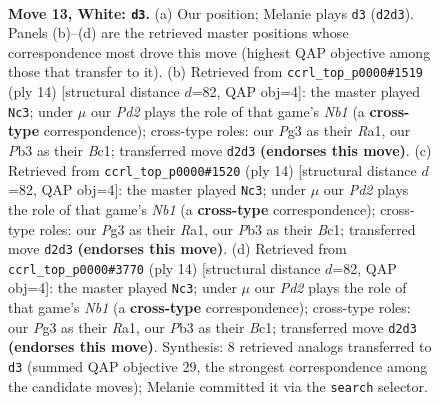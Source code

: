 \documentclass[11pt]{article}
\begin{document}
\clearpage

\begin{figure}[p]\centering
\begin{subfigure}{0.46\textwidth}\centering
\resizebox{\linewidth}{!}{%
\newchessgame
\chessboard[
  setfen={rn1q1rk1/4bp2/5np1/pppp3p/8/1P2PNP1/P2P1PKP/RNBQ1R2 w - - 0 13},
  showmover=false,
  pgfstyle=straightmove, color=movearrow, markmove={d2-d3}
]}
\caption{}
\end{subfigure}\hfill
\begin{subfigure}{0.46\textwidth}\centering
\resizebox{\linewidth}{!}{%
\newchessgame
\chessboard[
  setfen={rnb1qrk1/ppp1b1pp/3ppn2/5p2/2PP4/1P3NP1/P3PPBP/RNBQ1RK1 w - - 5 8},
  showmover=false,
  pgfstyle=straightmove, color=movearrow, markmove={b1-c3}
]}
\caption{}
\end{subfigure}
\\[4pt]
\begin{subfigure}{0.46\textwidth}\centering
\resizebox{\linewidth}{!}{%
\newchessgame
\chessboard[
  setfen={rnb1qrk1/ppp1b1pp/3ppn2/5p2/2PP4/1P3NP1/P3PPBP/RNBQ1RK1 w - - 5 8},
  showmover=false,
  pgfstyle=straightmove, color=movearrow, markmove={b1-c3}
]}
\caption{}
\end{subfigure}\hfill
\begin{subfigure}{0.46\textwidth}\centering
\resizebox{\linewidth}{!}{%
\newchessgame
\chessboard[
  setfen={rnb1qrk1/ppp1b1pp/3ppn2/5p2/2PP4/1P3NP1/P3PPBP/RNBQ1RK1 w - - 1 8},
  showmover=false,
  pgfstyle=straightmove, color=movearrow, markmove={b1-c3}
]}
\caption{}
\end{subfigure}
\caption{\textbf{Move 13, White: \texttt{d3}.} (a) Our position; Melanie plays \texttt{d3} (\texttt{d2d3}). Panels (b)--(d) are the retrieved master positions whose correspondence most drove this move (highest QAP objective among those that transfer to it). (b) Retrieved from \texttt{ccrl\_top\_p0000\#1519} (ply 14) [structural distance $d$=82, QAP obj=4]: the master played \texttt{Nc3}; under $\mu$ our \emph{Pd2} plays the role of that game's \emph{Nb1} (a \textbf{cross-type} correspondence); cross-type roles: our \emph{P}g3 as their \emph{R}a1, our \emph{P}b3 as their \emph{B}c1; transferred move \texttt{d2d3} \textbf{(endorses this move)}. (c) Retrieved from \texttt{ccrl\_top\_p0000\#1520} (ply 14) [structural distance $d$=82, QAP obj=4]: the master played \texttt{Nc3}; under $\mu$ our \emph{Pd2} plays the role of that game's \emph{Nb1} (a \textbf{cross-type} correspondence); cross-type roles: our \emph{P}g3 as their \emph{R}a1, our \emph{P}b3 as their \emph{B}c1; transferred move \texttt{d2d3} \textbf{(endorses this move)}. (d) Retrieved from \texttt{ccrl\_top\_p0000\#3770} (ply 14) [structural distance $d$=82, QAP obj=4]: the master played \texttt{Nc3}; under $\mu$ our \emph{Pd2} plays the role of that game's \emph{Nb1} (a \textbf{cross-type} correspondence); cross-type roles: our \emph{P}g3 as their \emph{R}a1, our \emph{P}b3 as their \emph{B}c1; transferred move \texttt{d2d3} \textbf{(endorses this move)}. Synthesis: 8 retrieved analogs transferred to \texttt{d3} (summed QAP objective 29, the strongest correspondence among the candidate moves); Melanie committed it via the \texttt{search} selector.}
\label{fig:thought-m24}
\end{figure}
\end{document}
